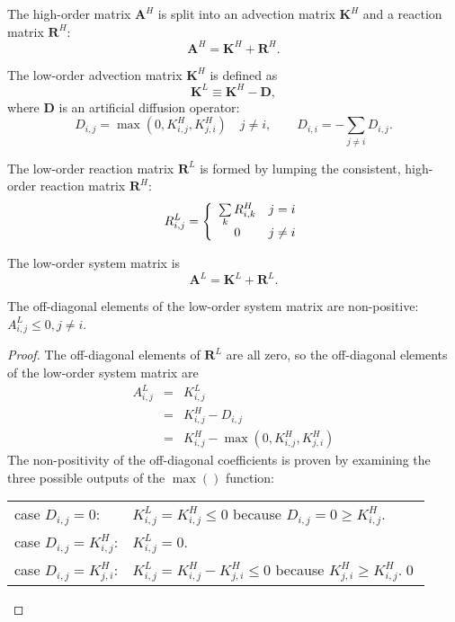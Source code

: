 The high-order matrix $\mathbf{A}^H$ is split into an advection matrix $\mathbf{K}^H$ and a reaction
matrix $\mathbf{R}^H$:
\begin{equation}
   \mathbf{A}^H = \mathbf{K}^H + \mathbf{R}^H.
\end{equation}
\begin{definition}
   The low-order advection matrix $\mathbf{K}^H$ is defined as
   \begin{equation}
      \mathbf{K}^L \equiv \mathbf{K}^H - \mathbf{D},
   \end{equation}
   where $\mathbf{D}$ is an artificial diffusion operator:
   \begin{equation}
      D_{i,j} = \max(0,K_{i,j}^H,K_{j,i}^H)\quad j\ne i,\qquad D_{i,i} = -\sum\limits_{j\ne i} D_{i,j}.
   \end{equation}
\end{definition}
\begin{definition}
   The low-order reaction matrix $\mathbf{R}^L$ is formed by lumping the consistent, high-order
   reaction matrix $\mathbf{R}^H$:
   \begin{equation}
      R_{i,j}^L = \left\{\begin{array}{c c}
         \sum\limits_k R_{i,k}^H & j = i\\
         0 & j\ne i
      \end{array}\right.
   \end{equation}
\end{definition}
The low-order system matrix is
\begin{equation}
   \mathbf{A}^L = \mathbf{K}^L + \mathbf{R}^L.
\end{equation}

\newpage
\begin{lemma}\label{offdiagonalnegative}
   The off-diagonal elements of the low-order system matrix are non-positive:
   $A^L_{i,j}\le 0, j\ne i$.
\end{lemma}
\begin{proof}
The off-diagonal elements of $\mathbf{R}^L$ are all zero, so the off-diagonal elements of the
low-order system matrix are
\begin{eqnarray*}
	A^L_{i,j} & = & K_{i,j}^L\\
             & = & K_{i,j}^H - D_{i,j}\\
             & = & K_{i,j}^H - \max(0,K_{i,j}^H,K_{j,i}^H)
\end{eqnarray*}
The non-positivity of the off-diagonal coefficients is proven by examining the three possible
outputs of the $\max()$ function:

\begin{tabular}{l l}
   case $D_{i,j}=0$:         & $K^L_{i,j} = K^H_{i,j} \leq 0$ because $D_{i,j}=0\geq K^H_{i,j}$.\\
   case $D_{i,j}=K^H_{i,j}$: & $K^L_{i,j} = 0$.\\
   case $D_{i,j}=K^H_{j,i}$: & $K^L_{i,j} = K^H_{i,j} - K^H_{j,i} \leq 0$ because $K^H_{j,i} \geq K^H_{i,j}$.\qed
\end{tabular}
\end{proof}

